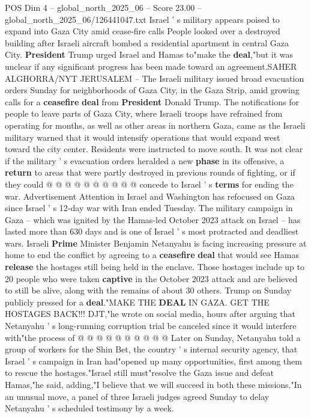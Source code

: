 \begin{textsample}{POS Dim 4 – global\_north\_2025\_06 – Score 23.00 – global\_north\_2025\_06/126441047.txt}  \label{ex:f4_pos_393}
Israel ' s military appears poised to expand into Gaza City amid cease-fire calls People looked over a destroyed building after Israeli aircraft bombed a residential apartment in central Gaza City. \textbf{President} Trump urged Israel and Hamas to"make the \textbf{deal},"but it was unclear if any significant progress has been made toward an agreement.SAHER ALGHORRA/NYT JERUSALEM -- The Israeli military issued broad evacuation orders Sunday for neighborhoods of Gaza City, in the Gaza Strip, amid growing calls for a \textbf{ceasefire} \textbf{deal} from \textbf{President} Donald Trump.
The notifications for people to leave parts of Gaza City, where Israeli troops have refrained from operating for months, as well as other areas in northern Gaza, came as the Israeli military warned that it would intensify operations that would expand west toward the city center.
Residents were instructed to move south.
It was not clear if the military ' s evacuation orders heralded a new \textbf{phase} in its offensive, a \textbf{return} to areas that were partly destroyed in previous rounds of fighting, or if they could @ @ @ @ @ @ @ @ @ @ concede to Israel ' s \textbf{terms} for ending the war.
Advertisement Attention in Israel and Washington has refocused on Gaza since Israel ' s 12-day war with Iran ended Tuesday.
The military campaign in Gaza -- which was ignited by the Hamas-led October 2023 attack on Israel -- has lasted more than 630 days and is one of Israel ' s most protracted and deadliest wars.
Israeli \textbf{Prime} Minister Benjamin Netanyahu is facing increasing pressure at home to end the conflict by agreeing to a \textbf{ceasefire} \textbf{deal} that would see Hamas \textbf{release} the hostages still being held in the enclave.
Those hostages include up to 20 people who were taken \textbf{captive} in the October 2023 attack and are believed to still be alive, along with the remains of about 30 others.
Trump on Sunday publicly pressed for a \textbf{deal}."MAKE THE \textbf{DEAL} IN GAZA.
GET THE HOSTAGES BACK!!!
DJT,"he wrote on social media, hours after arguing that Netanyahu ' s long-running corruption trial be canceled since it would interfere with"the process of @ @ @ @ @ @ @ @ @ @ Later on Sunday, Netanyahu told a group of workers for the Shin Bet, the country ' s internal security agency, that Israel ' s campaign in Iran had"opened up many opportunities, first among them to rescue the hostages."Israel still must"resolve the Gaza issue and defeat Hamas,"he said, adding,"I believe that we will succeed in both these missions."In an unusual move, a panel of three Israeli judges agreed Sunday to delay Netanyahu ' s scheduled testimony by a week.

\end{textsample}

